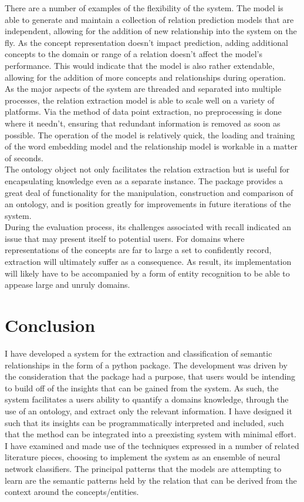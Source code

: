 \documentclass[12pt]{article} %
\begin{document}
There are a number of examples of the flexibility of the system. The model is able to generate and maintain a collection of relation prediction models that are independent, allowing for the addition of new relationship into the system on the fly. As the concept representation doesn’t impact prediction, adding additional concepts to the domain or range of a relation doesn’t affect the model's performance. This would indicate that the model is also rather extendable, allowing for the addition of more concepts and relationships during operation.\\ 

As the major aspects of the system are threaded and separated into multiple processes, the relation extraction model is able to scale well on a variety of platforms. Via the method of data point extraction, no preprocessing is done where it needn’t, ensuring that redundant information is removed as soon as possible. The operation of the model is relatively quick, the loading and training of the word embedding model and the relationship model is workable in a matter of seconds.\\

The ontology object not only facilitates the relation extraction but is useful for encapsulating knowledge even as a separate instance. The package provides a great deal of functionality for the manipulation, construction and comparison of an ontology, and is position greatly for improvements in future iterations of the system.\\

During the evaluation process, its challenges associated with recall indicated an issue that may present itself to potential users. For domains where representations of the concepts are far to large a set to confidently record, extraction will ultimately suffer as a consequence. As result, its implementation will likely have to be accompanied by a form of entity recognition to be able to appease large and unruly domains.


\section{Conclusion}

I have developed a system for the extraction and classification of semantic relationships in the form of a python package. The development was driven by the consideration that the package had a purpose, that users would be intending to build off of the insights that can be gained from the system. As such, the system facilitates a users ability to quantify a domains knowledge, through the use of an ontology, and extract only the relevant information. I have designed it such that its insights can be programmatically interpreted and included, such that the method can be integrated into a preexisting system with minimal effort. I have examined and made use of the techniques expressed in a number of related literature pieces, choosing to implement the system as an ensemble of neural network classifiers. The principal patterns that the models are attempting to learn are the semantic patterns held by the relation that can be derived from the context around the concepts/entities.\\
\end{document}
